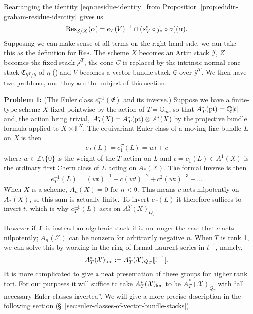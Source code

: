 Rearranging the identity~\ref{eqn:residue-identity}~from Proposition~\ref{prop:edidin-graham-residue-identity}~gives us
\begin{equation}\label{eqn:residue-identity-with-residue-isolated}
  \operatorname{Res}_{Z/X}(\alpha) = e_T(V)^{-1}\cap (s^*_V\circ j_*\circ \sigma)(\alpha).
\end{equation}
Supposing we can make sense of all terms on the right hand side, we can take this as the definition for \(\operatorname{Res}\). The scheme \(X\) becomes an Artin stack \(\mathcal Y\), \(Z\) becomes the fixed stack \(\mathcal Y^T\), the cone \(C\) is replaced by the intrinsic normal cone stack \(\mathfrak C_{\mathcal Y^T/\mathcal Y}\) of \(\eta\) (\cite[Definition 2.30]{manolache_VirtualPullbacks2012}) and \(V\) becomes a vector bundle stack \(\mathfrak E\) over \(\mathcal Y^T\). We then have two problems, and they are the subject of this section.

\bigskip

\noindent\textbf{Problem 1:} (The Euler class \(e^{-1}_T(\mathfrak E)\) and its inverse.) Suppose we have a finite-type scheme \(X\) fixed pointwise by the action of \(T = \mathbb G_m\), so that \(A^*_T(\operatorname{pt}) = \mathbb Q[t]\) and, the action being trivial, \(A^*_T(X) = A^*_T(\operatorname{pt})\otimes A^*(X)\) by the projective bundle formula applied to \(X\times \mathbb P^N\). The equivariant Euler class of a moving line bundle \(L\) on \(X\) is then
\begin{align*}
  e_T(L) = c_1^T(L) = wt + c
\end{align*}
where \(w\in \mathbb Z\setminus\{0\}\) is the weight of the \(T\)-action on \(L\) and \(c = c_1(L)\in A^1(X)\) is the ordinary first Chern class of \(L\) acting on \(A_*(X)\). The formal inverse is then
\begin{align*}
  e_T^{-1}(L) = (wt)^{-1} - c(wt)^{-2} + c^2(wt)^{-3} - \dots
\end{align*}
When \(X\) is a scheme, \(A_n(X) = 0\) for \(n < 0\). This means \(c\) acts nilpotently on \(A_*(X)\), so this sum is actually finite. To invert \(e_T(L)\) it therefore suffices to invert \(t\), which is why \(e^{-1}_T(L)\) acts on \(A^T_*(X)_{Q_T}\).

However if \(\mathcal X\) is instead an algebraic stack it is no longer the case that \(c\) acts nilpotently; \(A_n(\mathcal X)\) can be nonzero for arbitrarily negative \(n\). When \(T\) is rank 1, we can solve this by working in the ring of formal Laurent series in \(t^{-1}\), namely,
\[A^*_T(\mathcal X)_{\operatorname{loc}} := A^*_T(\mathcal X)_{Q_T}[\hspace{-2pt}[t^{-1}]\hspace{-2.5pt}].\]
It is more complicated to give a neat presentation of these groups for higher rank tori. For our purposes it will suffice to take \( A^*_T(\mathcal X)_{\operatorname{loc}}\) to be \(A^*_T(\mathcal X)_{Q_T}\) with ``all necessary Euler classes inverted''. We will give a more precise description in the following section (\S~\ref{sec:euler-classes-of-vector-bundle-stacks}).


